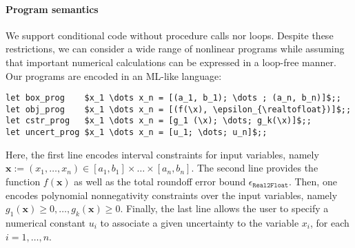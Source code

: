 \documentclass[preprint,fleqn,nocopyrightspace]{sigplanconf}
\newcommand{\x}{\mathbf{x}}
\newcommand{\realtofloat}{\mathtt{Real2Float}}
\theoremstyle{plain}
\begin{document}
\paragraph{Program semantics}
%
We support conditional code without procedure calls nor loops. Despite these restrictions, we can consider a wide range of nonlinear programs while assuming that  important numerical calculations can be expressed in a loop-free manner. 
Our programs are encoded in an ML-like language:
\begin{lstlisting}
let box_prog    $x_1 \dots x_n = [(a_1, b_1); \dots ; (a_n, b_n)]$;;
let obj_prog    $x_1 \dots x_n = [(f(\x), \epsilon_{\realtofloat})]$;;
let cstr_prog   $x_1 \dots x_n = [g_1 (\x); \dots; g_k(\x)]$;;
let uncert_prog $x_1 \dots x_n = [u_1; \dots; u_n]$;;
\end{lstlisting}
Here, the first line encodes interval constraints for input variables, namely $\x := (x_1, \dots, x_n) \in [a_1, b_1]\times \dots \times [a_n, b_n]$.
The second line provides the function $f(\x)$ as well as the total roundoff error bound $\epsilon_{\realtofloat}$.
Then, one encodes polynomial nonnegativity constraints over the input variables, namely $g_1(\x) \geq 0, \dots, g_k(\x) \geq 0$. Finally, the last line allows the user to specify a numerical constant $u_i$ to associate a given uncertainty to the variable $x_i$, for each $i= 1, \dots, n$.
\end{document}
